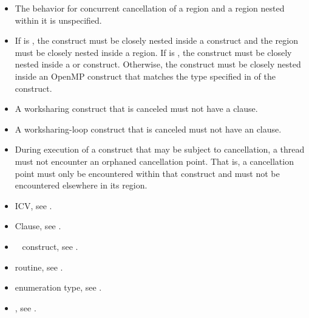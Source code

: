 \begin{itemize}
\item The behavior for concurrent cancellation of a region and a region nested within it is
unspecified.

\item If  is , the 
construct must be closely nested inside a  construct and the
 region must be closely nested inside a  region. If
 is , the  construct
must be closely nested inside a  or  construct.
Otherwise, the  construct must be closely
nested inside an OpenMP construct that matches the type specified in
 of the  construct.

\item A worksharing construct that is canceled must not have a  clause.

\item A worksharing-loop construct that is canceled must not have an  clause.

\item During execution of a construct that may be subject to cancellation, a
thread must not encounter an orphaned cancellation point. That is, a
cancellation point must only be encountered within that construct and must
not be encountered elsewhere in its region.
\end{itemize}

\crossreferences
\begin{itemize}
\item {} ICV, see
.

\item {} Clause, see .

\item {}~ construct, see
.

\item {} routine, see
.

\item {} enumeration type, see .

\item {}, see .

\end{itemize}









